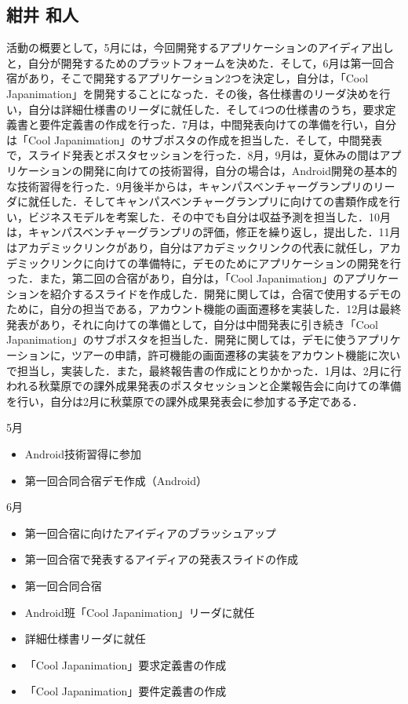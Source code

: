 \subsection{紺井 和人}
\par
活動の概要として，5月には，今回開発するアプリケーションのアイディア出しと，自分が開発するためのプラットフォームを決めた．そして，6月は第一回合宿があり，そこで開発するアプリケーション2つを決定し，自分は，「Cool Japanimation」を開発することになった．その後，各仕様書のリーダ決めを行い，自分は詳細仕様書のリーダに就任した．そして4つの仕様書のうち，要求定義書と要件定義書の作成を行った．7月は，中間発表向けての準備を行い，自分は「Cool Japanimation」のサブポスタの作成を担当した．そして，中間発表で，スライド発表とポスタセッションを行った．8月，9月は，夏休みの間はアプリケーションの開発に向けての技術習得，自分の場合は，Android開発の基本的な技術習得を行った．9月後半からは，キャンパスベンチャーグランプリのリーダに就任した．そしてキャンパスベンチャーグランプリに向けての書類作成を行い，ビジネスモデルを考案した．その中でも自分は収益予測を担当した．10月は，キャンパスベンチャーグランプリの評価，修正を繰り返し，提出した．11月はアカデミックリンクがあり，自分はアカデミックリンクの代表に就任し，アカデミックリンクに向けての準備特に，デモのためにアプリケーションの開発を行った．また，第二回の合宿があり，自分は，「Cool Japanimation」のアプリケーションを紹介するスライドを作成した．開発に関しては，合宿で使用するデモのために，自分の担当である，アカウント機能の画面遷移を実装した．12月は最終発表があり，それに向けての準備として，自分は中間発表に引き続き「Cool Japanimation」のサブポスタを担当した．開発に関しては，デモに使うアプリケーションに，ツアーの申請，許可機能の画面遷移の実装をアカウント機能に次いで担当し，実装した．また，最終報告書の作成にとりかかった．1月は、2月に行われる秋葉原での課外成果発表のポスタセッションと企業報告会に向けての準備を行い，自分は2月に秋葉原での課外成果発表会に参加する予定である．
\par
5月
\begin{itemize}
\item Android技術習得に参加
\item 第一回合同合宿デモ作成（Android）
\end{itemize}
6月
\begin{itemize}
\item 第一回合宿に向けたアイディアのブラッシュアップ
\item 第一回合宿で発表するアイディアの発表スライドの作成
\item 第一回合同合宿
\item Android班「Cool Japanimation」リーダに就任
\item 詳細仕様書リーダに就任
\item 「Cool Japanimation」要求定義書の作成
\item 「Cool Japanimation」要件定義書の作成
\end{itemize}
